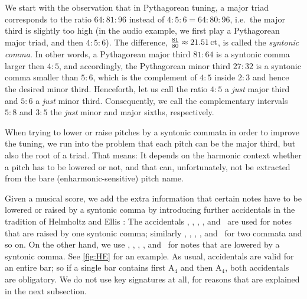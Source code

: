 \documentclass[british,11pt]{scrartcl}
\begin{document}
We start with the observation that in Pythagorean tuning, a major triad
corresponds to the ratio $64:81:96$ instead of $4:5:6=64:80:96$, i.e.\ the major
third is slightly too high (in the audio example, we first play a Pythagorean
major triad, and then $4:5:6$). The difference,
$\frac{81}{80}\approx 21.51\,\mathrm{ct}$, is called the \emph{syntonic comma}.
In other words, a Pythagorean major third $81:64$ is a syntonic comma larger then
$4:5$, and accordingly, the Pythagorean minor third $27:32$ is a syntonic comma
smaller than $5:6$, which is the complement of $4:5$ inside $2:3$ and hence the
desired minor third. Henceforth, let us call the ratio $4:5$ a \emph{just} major
third and $5:6$ a \emph{just} minor third. Consequently, we call the
complementary intervals $5:8$ and $3:5$ the \emph{just} minor and major sixths,
respectively.

When trying to lower or raise pitches by a syntonic commata in order to improve
the tuning, we run into the problem that each pitch can be the major third, but
also the root of a triad. That means: It depends on the harmonic context whether
a pitch has to be lowered or not, and that can, unfortunately, not be extracted
from the bare (enharmonic-sensitive) pitch name.

Given a musical score, we add the extra information that certain notes have to
be lowered or raised by a syntonic comma by introducing further accidentals in
the tradition of Helmholtz and Ellis \cite{HE}: The accidentals \dsharpp,
\sharpp, \naturalp, \flatp, and \dflatp\ are used for notes that are raised by
one syntonic comma; similarly \dsharpp, \sharppp, \naturalpp, \flatpp, and
\dflatpp\ for two commata and so on. On the other hand, we use \dsharpm,
\sharpm, \naturalm, \flatm, and \dflatm\ for notes that are lowered by a
syntonic comma. See \cref{fig:HE} for an example.  As usual, accidentals are
valid for an entire bar; so if a single bar contains first \naturalm A$_4$ and
then \natural A$_4$, both accidentals are obligatory.  We do not use key
signatures at all, for reasons that are explained in the next
subsection.
\end{document}
